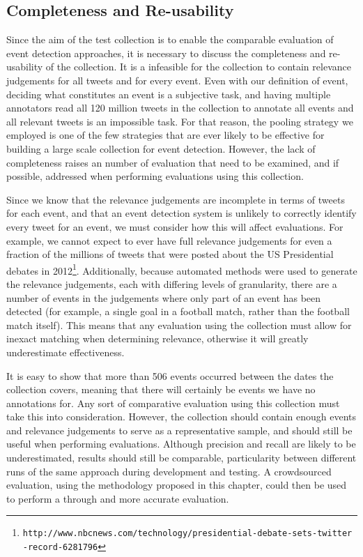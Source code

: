 \subsection{Completeness and Re-usability}
Since the aim of the test collection is to enable the comparable evaluation of event detection approaches, it is necessary to discuss the completeness and re-usability of the collection.
It is a infeasible for the collection to contain relevance judgements for all tweets and for every event.
Even with our definition of event, deciding what constitutes an event is a subjective task, and having multiple annotators read all 120 million tweets in the collection to annotate all events and all relevant tweets is an impossible task.
For that reason, the pooling strategy we employed is one of the few strategies that are ever likely to be effective for building a large scale collection for event detection.
However, the lack of completeness raises an number of evaluation that need to be examined, and if possible, addressed when performing evaluations using this collection.

Since we know that the relevance judgements are incomplete in terms of tweets for each event, and that an event detection system is unlikely to correctly identify every tweet for an event, we must consider how this will affect evaluations.
For example, we cannot expect to ever have full relevance judgements for even a fraction of the millions of tweets that were posted about the US Presidential debates in 2012\footnote{\texttt{http://www.nbcnews.com/technology/presidential-debate-sets-twitter\\-record-6281796}}.
Additionally, because automated methods were used to generate the relevance judgements, each with differing levels of granularity, there are a number of events in the judgements where only part of an event has been detected (for example, a single goal in a football match, rather than the football match itself).
This means that any evaluation using the collection must allow for inexact matching when determining relevance, otherwise it will greatly underestimate effectiveness.

It is easy to show that more than 506 events occurred between the dates the collection covers, meaning that there will certainly be events we have no annotations for.
Any sort of comparative evaluation using this collection must take this into consideration.
However, the collection should contain enough events and relevance judgements to serve as a representative sample, and should still be useful when performing evaluations.
Although precision and recall are likely to be underestimated, results should still be comparable, particularity between different runs of the same approach during development and testing.
A crowdsourced evaluation, using the methodology proposed in this chapter, could then be used to perform a through and more accurate evaluation.


